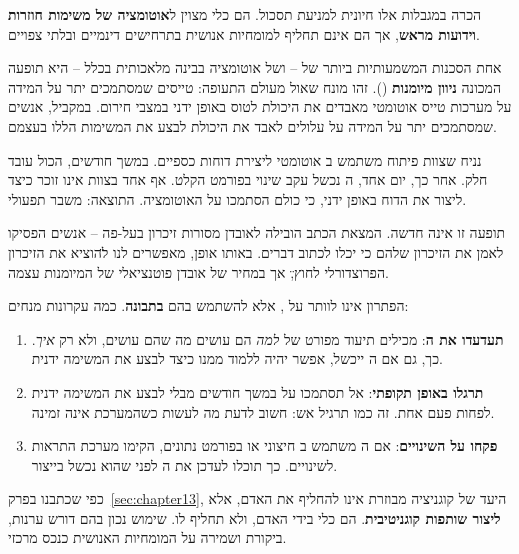 הכרה במגבלות אלו חיונית למניעת תסכול.  הם כלי מצוין ל\textbf{אוטומציה של משימות חוזרות וידועות מראש}, אך הם אינם תחליף למומחיות אנושית בתרחישים דינמיים ובלתי צפויים.


אחת הסכנות המשמעותיות ביותר של  – ושל אוטומציה בבינה מלאכותית בכלל – היא תופעה המכונה \textbf{ניוון מיומנות} ()\cite{anthropic2025atrophy}. זהו מונח שאול מעולם התעופה: טייסים שמסתמכים יתר על המידה על מערכות טייס אוטומטי מאבדים את היכולת לטוס באופן ידני במצבי חירום. במקביל, אנשים שמסתמכים יתר על המידה על  עלולים לאבד את היכולת לבצע את המשימות הללו בעצמם.

נניח שצוות פיתוח משתמש ב אוטומטי ליצירת דוחות כספיים. במשך חודשים, הכול עובד חלק. אחר כך, יום אחד, ה נכשל עקב שינוי בפורמט הקלט. אף אחד בצוות אינו זוכר כיצד ליצור את הדוח באופן ידני, כי כולם הסתמכו על האוטומציה. התוצאה: משבר תפעולי.

תופעה זו אינה חדשה. המצאת הכתב הובילה לאובדן מסורות זיכרון בעל-פה – אנשים הפסיקו לאמן את הזיכרון שלהם כי יכלו לכתוב דברים. באותו אופן,  מאפשרים לנו \"להוציא את הזיכרון הפרוצדורלי לחוץ\", אך במחיר של אובדן פוטנציאלי של המיומנות עצמה.

הפתרון אינו לוותר על , אלא להשתמש בהם \textbf{בתבונה}. כמה עקרונות מנחים:

\begin{enumerate}
  \item \textbf{תעדעדו את ה}: מכילים תיעוד מפורט של \textit{למה} הם עושים מה שהם עושים, ולא רק \textit{איך}. כך, גם אם ה ייכשל, אפשר יהיה ללמוד ממנו כיצד לבצע את המשימה ידנית.
  \item \textbf{תרגלו באופן תקופתי}: אל תסתמכו על  במשך חודשים מבלי לבצע את המשימה ידנית לפחות פעם אחת. זה כמו תרגיל אש: חשוב לדעת מה לעשות כשהמערכת אינה זמינה.
  \item \textbf{פקחו על השינויים}: אם ה משתמש ב חיצוני או בפורמט נתונים, הקימו מערכת התראות לשינויים. כך תוכלו לעדכן את ה לפני שהוא נכשל בייצור.
\end{enumerate}

כפי שכתבנו בפרק~\ref{sec:chapter13}, היעד של קוגניציה מבוזרת אינו להחליף את האדם, אלא \textbf{ליצור שותפות קוגניטיבית}.  הם כלי בידי האדם, ולא תחליף לו. שימוש נכון בהם דורש ערנות, ביקורת ושמירה על המומחיות האנושית כנכס מרכזי.


